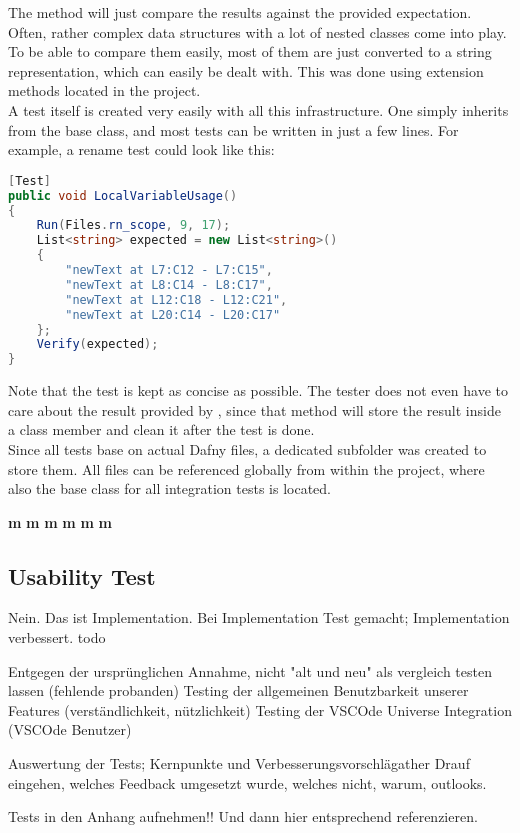 The  method will just compare the results against the provided expectation. Often, rather complex data structures with a lot of nested classes come into play. To be able to compare them easily, most of them are just converted to a string representation, which can easily be dealt with. This was done using extension methods located in the  project.\\

A test itself is created very easily with all this infrastructure. One simply inherits from the base class, and most tests can be written in just a few lines. For example, a rename test could look like this:

\begin{lstlisting}[language=csharp, caption={Sample Integration Test}, captionpos=b, label={lst:sampleintegrationtest}]
[Test]
public void LocalVariableUsage()
{
    Run(Files.rn_scope, 9, 17);
    List<string> expected = new List<string>()
    {
        "newText at L7:C12 - L7:C15",
        "newText at L8:C14 - L8:C17",
        "newText at L12:C18 - L12:C21",
        "newText at L20:C14 - L20:C17"
    };
    Verify(expected);
}
\end{lstlisting}

Note that the test is kept as concise as possible. The tester does not even have to care about the result provided by , since that method will store the result inside a class member and clean it after the test is done.\\

Since all tests base on actual Dafny files, a dedicated subfolder was created to store them. All files can be referenced globally from within the  project, where also the base class for all integration tests is located.




\textbf{m}
\textbf{m}
\textbf{m}
\textbf{m}
\textbf{m}
\textbf{m}


\subsection{Usability Test}
Nein. Das ist Implementation. Bei Implementation Test gemacht; Implementation verbessert.
todo

Entgegen der ursprünglichen Annahme, nicht "alt und neu" als vergleich testen lassen (fehlende probanden)
Testing der allgemeinen Benutzbarkeit unserer Features (verständlichkeit, nützlichkeit)
Testing der VSCOde Universe Integration (VSCOde Benutzer)

Auswertung der Tests; Kernpunkte und Verbesserungsvorschlägather
Drauf eingehen, welches Feedback umgesetzt wurde, welches nicht, warum, outlooks.

Tests in den Anhang aufnehmen!! Und dann hier entsprechend referenzieren.
